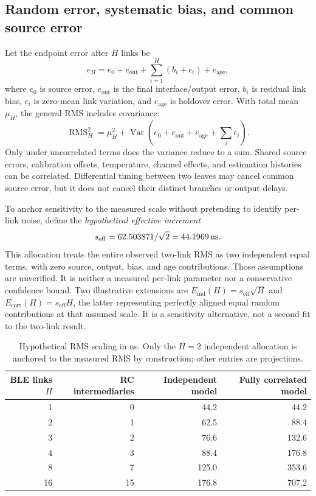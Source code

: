 \documentclass[11pt,letterpaper]{article}
\begin{document}
\subsection{Random error, systematic bias, and common source error}
Let the endpoint error after $H$ links be
\begin{equation}
e_H=e_0+e_{\mathrm{out}}+\sum_{i=1}^{H}(b_i+\epsilon_i)+e_{\mathrm{age}},
\end{equation}
where $e_0$ is source error, $e_{\mathrm{out}}$ is the final interface/output error, $b_i$ is residual link bias, $\epsilon_i$ is zero-mean link variation, and $e_{\mathrm{age}}$ is holdover error. With total mean $\mu_H$, the general RMS includes covariance:
\begin{equation}
\operatorname{RMS}_H^2=\mu_H^2+\operatorname{Var}\!\left(e_0+e_{\mathrm{out}}+e_{\mathrm{age}}+\sum_i\epsilon_i\right).
\end{equation}
Only under uncorrelated terms does the variance reduce to a sum. Shared source errors, calibration offsets, temperature, channel effects, and estimation histories can be correlated. Differential timing between two leaves may cancel common source error, but it does not cancel their distinct branches or output delays.

To anchor sensitivity to the measured scale without pretending to identify per-link noise, define the \emph{hypothetical effective increment}
\begin{equation}
s_{\mathrm{eff}}=62.503871/\sqrt{2}=44.1969\,\mathrm{ns}.
\end{equation}
This allocation treats the entire observed two-link RMS as two independent equal terms, with zero source, output, bias, and age contributions. Those assumptions are unverified. It is neither a measured per-link parameter nor a conservative confidence bound. Two illustrative extensions are $E_{\mathrm{ind}}(H)=s_{\mathrm{eff}}\sqrt H$ and $E_{\mathrm{corr}}(H)=s_{\mathrm{eff}}H$, the latter representing perfectly aligned equal random contributions at that assumed scale. It is a sensitivity alternative, not a second fit to the two-link result.
\begin{table}[htbp]\centering\small
\caption{Hypothetical RMS scaling in ns. Only the $H=2$ independent allocation is anchored to the measured RMS by construction; other entries are projections.}\label{tab:hops}
\begin{tabular}{@{}rrrr@{}}\toprule
BLE links $H$ & RC intermediaries & Independent model & Fully correlated model\\\midrule
1&0&44.2&44.2\\
2&1&62.5&88.4\\
3&2&76.6&132.6\\
4&3&88.4&176.8\\
8&7&125.0&353.6\\
16&15&176.8&707.2\\\bottomrule
\end{tabular}
\end{table}
\end{document}
